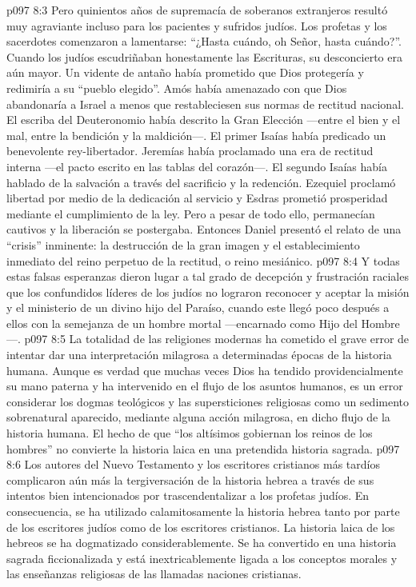 \vs p097 8:3 Pero quinientos años de supremacía de soberanos extranjeros resultó muy agraviante incluso para los pacientes y sufridos judíos. Los profetas y los sacerdotes comenzaron a lamentarse: “¿Hasta cuándo, oh Señor, hasta cuándo?”. Cuando los judíos escudriñaban honestamente las Escrituras, su desconcierto era aún mayor. Un vidente de antaño había prometido que Dios protegería y redimiría a su “pueblo elegido”. Amós había amenazado con que Dios abandonaría a Israel a menos que restableciesen sus normas de rectitud nacional. El escriba del Deuteronomio había descrito la Gran Elección ---entre el bien y el mal, entre la bendición y la maldición---. El primer Isaías había predicado un benevolente rey\hyp{}libertador. Jeremías había proclamado una era de rectitud interna ---el pacto escrito en las tablas del corazón---. El segundo Isaías había hablado de la salvación a través del sacrificio y la redención. Ezequiel proclamó libertad por medio de la dedicación al servicio y Esdras prometió prosperidad mediante el cumplimiento de la ley. Pero a pesar de todo ello, permanecían cautivos y la liberación se postergaba. Entonces Daniel presentó el relato de una “crisis” inminente: la destrucción de la gran imagen y el establecimiento inmediato del reino perpetuo de la rectitud, o reino mesiánico.
\vs p097 8:4 Y todas estas falsas esperanzas dieron lugar a tal grado de decepción y frustración raciales que los confundidos líderes de los judíos no lograron reconocer y aceptar la misión y el ministerio de un divino hijo del Paraíso, cuando este llegó poco después a ellos con la semejanza de un hombre mortal ---encarnado como Hijo del Hombre---.
\vs p097 8:5 \pc La totalidad de las religiones modernas ha cometido el grave error de intentar dar una interpretación milagrosa a determinadas épocas de la historia humana. Aunque es verdad que muchas veces Dios ha tendido providencialmente su mano paterna y ha intervenido en el flujo de los asuntos humanos, es un error considerar los dogmas teológicos y las supersticiones religiosas como un sedimento sobrenatural aparecido, mediante alguna acción milagrosa, en dicho flujo de la historia humana. El hecho de que “los altísimos gobiernan los reinos de los hombres” no convierte la historia laica en una pretendida historia sagrada.
\vs p097 8:6 Los autores del Nuevo Testamento y los escritores cristianos más tardíos complicaron aún más la tergiversación de la historia hebrea a través de sus intentos bien intencionados por trascendentalizar a los profetas judíos. En consecuencia, se ha utilizado calamitosamente la historia hebrea tanto por parte de los escritores judíos como de los escritores cristianos. La historia laica de los hebreos se ha dogmatizado considerablemente. Se ha convertido en una historia sagrada ficcionalizada y está inextricablemente ligada a los conceptos morales y las enseñanzas religiosas de las llamadas naciones cristianas.
